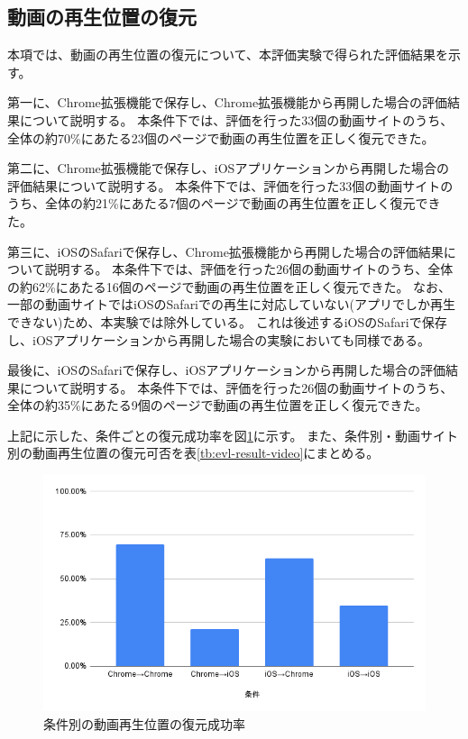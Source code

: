 \subsection{動画の再生位置の復元}
本項では、動画の再生位置の復元について、本評価実験で得られた評価結果を示す。

第一に、Chrome拡張機能で保存し、Chrome拡張機能から再開した場合の評価結果について説明する。
本条件下では、評価を行った33個の動画サイトのうち、全体の約70\%にあたる23個のページで動画の再生位置を正しく復元できた。

第二に、Chrome拡張機能で保存し、iOSアプリケーションから再開した場合の評価結果について説明する。
本条件下では、評価を行った33個の動画サイトのうち、全体の約21\%にあたる7個のページで動画の再生位置を正しく復元できた。

第三に、iOSのSafariで保存し、Chrome拡張機能から再開した場合の評価結果について説明する。
本条件下では、評価を行った26個の動画サイトのうち、全体の約62\%にあたる16個のページで動画の再生位置を正しく復元できた。
なお、一部の動画サイトではiOSのSafariでの再生に対応していない(アプリでしか再生できない)ため、本実験では除外している。
これは後述するiOSのSafariで保存し、iOSアプリケーションから再開した場合の実験においても同様である。

最後に、iOSのSafariで保存し、iOSアプリケーションから再開した場合の評価結果について説明する。
本条件下では、評価を行った26個の動画サイトのうち、全体の約35\%にあたる9個のページで動画の再生位置を正しく復元できた。

上記に示した、条件ごとの復元成功率を図\ref{fig:success-rate-video}に示す。
また、条件別・動画サイト別の動画再生位置の復元可否を表\ref{tb:evl-result-video}にまとめる。

\begin{figure}[htbp]
  \caption{条件別の動画再生位置の復元成功率}
  \label{fig:success-rate-video}
  \begin{center}
    \includegraphics[bb=0 0 600 371,width=15cm]{img/060_evaluation/result/video/success-rate-video.pdf}
  \end{center}
\end{figure}

